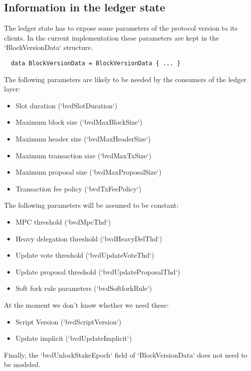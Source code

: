 \subsection{Information in the ledger state}
\label{sec:information-in-ledger-state}

The ledger state has to expose some parameters of the protocol version to its
clients. In the current implementation these parameters are kept in the
`BlockVersionData` structure.

\begin{lstlisting}
  data BlockVersionData = BlockVersionData { ... }
\end{lstlisting}

The following parameters are likely to be needed by the consumers of the ledger
layer:

\begin{itemize}
\item Slot duration (`bvdSlotDuration`)
\item Maximum block size (`bvdMaxBlockSize`)
\item Maximum header size (`bvdMaxHeaderSize`)
\item Maximum transaction size (`bvdMaxTxSize`)
\item Maximum proposal size (`bvdMaxProposalSize`)
\item Transaction fee policy (`bvdTxFeePolicy`)
\end{itemize}

The following parameters will be assumed to be constant:
\begin{itemize}
\item MPC threshold (`bvdMpcThd`)
\item Heavy delegation threshold (`bvdHeavyDelThd`)
\item Update vote threshold (`bvdUpdateVoteThd`)
\item Update proposal threshold (`bvdUpdateProposalThd`)
\item Soft fork rule parameters (`bvdSoftforkRule`)
\end{itemize}

At the moment we don't know whether we need these:

\begin{itemize}
\item Script Version (`bvdScriptVersion`)
\item Update implicit (`bvdUpdateImplicit`)
\end{itemize}

Finally, the `bvdUnlockStakeEpoch` field of `BlockVersionData` does not need to
be modeled.
